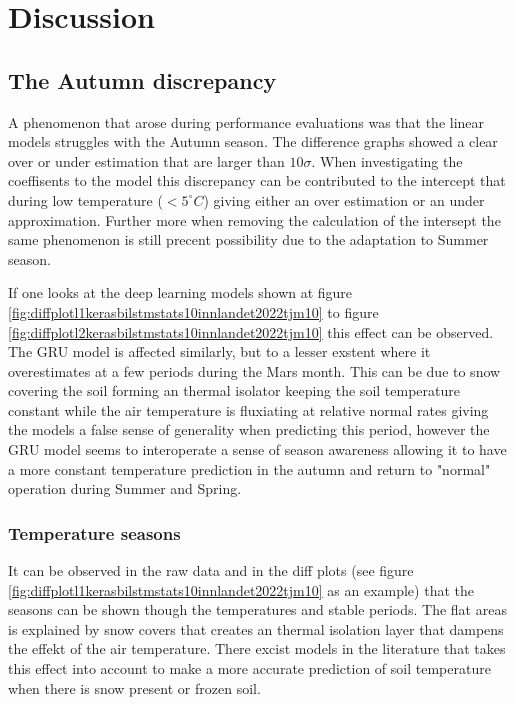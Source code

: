 \section{Discussion}

\subsection{The Autumn discrepancy}\label{sec:autumn}

A phenomenon that arose during performance evaluations was that the linear models struggles with the Autumn season. The difference graphs showed a clear over or under estimation that are larger than $10\sigma$. When investigating the coeffisents to the model  this discrepancy can be contributed to the intercept that during low temperature ($<5^\circ C$) giving either an over estimation or an under approximation. Further more when removing the calculation of the intersept the same phenomenon is still precent possibility due to the adaptation to Summer season.

If one looks at the deep learning models shown at figure \ref{fig:diffplotl1kerasbilstmstats10innlandet2022tjm10} to figure \ref{fig:diffplotl2kerasbilstmstats10innlandet2022tjm10} this effect can be observed. The GRU model is affected similarly, but to a lesser exstent where it overestimates at a few periods during the Mars month. This can be due to snow covering the soil forming an thermal isolator keeping the soil temperature constant while the air temperature is fluxiating at relative normal rates giving the models a false sense of generality when predicting this period, however the GRU model seems to interoperate a sense of season awareness allowing it to have a more constant temperature prediction in the autumn and return to "normal" operation during Summer and Spring. 

\subsubsection{Temperature seasons}

It can be observed in the raw data and in the diff plots (see figure \ref{fig:diffplotl1kerasbilstmstats10innlandet2022tjm10} as an example) that the seasons can be shown though the temperatures and stable periods. The flat areas is explained by snow covers that creates an thermal isolation layer that dampens the effekt of the air temperature. There excist models in the literature that takes this effect into account\cite{rankinen_simple_2004,stuurop_simulating_2021} to make a more accurate prediction of soil temperature when there is snow present or frozen soil.

